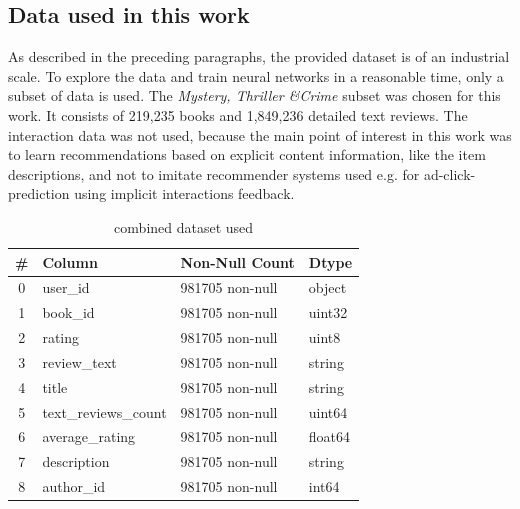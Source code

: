 \documentclass[10pt,final,journal,a4paper,oneside,twocolumn]{IEEEtran}
\begin{document}
\subsection{Data used in this work}
As described in the preceding paragraphs, the provided dataset is of an industrial scale. To explore the data and train neural networks in a reasonable time, only a subset of data is used.
The \emph{Mystery, Thriller \&Crime} subset was chosen for this work. It consists of 219,235 books and 1,849,236 detailed text reviews. The interaction data was not used, because the main point of interest in this work was to learn recommendations based on explicit content information, like the item descriptions, and not to imitate recommender systems used e.g. for ad-click-prediction using implicit interactions feedback.

\begin{table}[h]
\begin{center}
        \begin{tabular}{clll}
            \toprule
            \# & Column & Non-Null Count & Dtype \\
            \midrule
            0 & user\_id & 981705 non-null & object \\
            1 & book\_id & 981705 non-null & uint32 \\
            2 & rating & 981705 non-null & uint8 \\
            3 & review\_text & 981705 non-null & string \\
            4 & title & 981705 non-null & string \\
            5 & text\_reviews\_count & 981705 non-null & uint64 \\
            6 & average\_rating & 981705 non-null & float64 \\
            7 & description & 981705 non-null & string \\
            8 & author\_id & 981705 non-null & int64 \\
            \bottomrule
                    \end{tabular}
        \caption{combined dataset used}
        \label{tab:all_data}
    
\end{center}\end{table}

\end{document}
